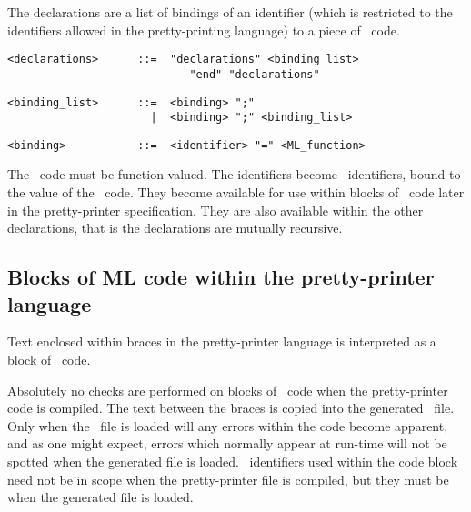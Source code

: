 The declarations are a list of bindings of an identifier (which is restricted
to the identifiers allowed in the pretty-printing language) to a piece of \ML\
code.

\begin{small}\begin{verbatim}
<declarations>      ::=  "declarations" <binding_list>
                            "end" "declarations"
\end{verbatim}\end{small}

\begin{small}\begin{verbatim}
<binding_list>      ::=  <binding> ";"
                      |  <binding> ";" <binding_list>
\end{verbatim}\end{small}

\begin{small}\begin{verbatim}
<binding>           ::=  <identifier> "=" <ML_function>
\end{verbatim}\end{small}

\noindent
The \ML\ code must be function valued. The identifiers become \ML\ identifiers,
bound to the value of the \ML\ code. They become available for use within
blocks of \ML\ code later in the pretty-printer specification. They are also
available within the other declarations, that is the declarations are mutually
recursive.


\subsection{Blocks of ML code within the pretty-printer
            language\label{mlfunction}}

Text enclosed within braces in the pretty-printer language is interpreted as
a block of \ML\ code.

Absolutely no checks are performed on blocks of \ML\ code when the
pretty-printer code is compiled. The text between the braces is copied into
the generated \ML\ file. Only when the \ML\ file is loaded will any errors
within the code become apparent, and as one might expect, errors which
normally appear at run-time will not be spotted when the generated file is
loaded. \ML\ identifiers used within the code block need not be in scope when
the pretty-printer file is compiled, but they must be when the generated file
is loaded.

